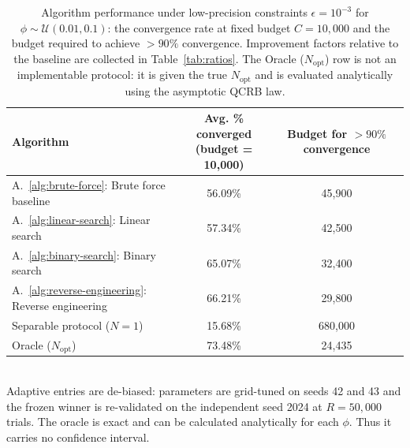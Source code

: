 \begin{table}[ht]
\centering
\caption{Algorithm performance under low-precision constraints $\epsilon=10^{-3}$ for $\phi\sim\mathcal{U}(0.01,0.1)$: the convergence rate at fixed budget $C=10{,}000$ and the budget required to achieve \(>90\%\) convergence. Improvement factors relative to the baseline are collected in Table~\ref{tab:ratios}. The Oracle ($N_\text{opt}$) row is not an implementable protocol: it is given the true $N_\text{opt}$ and is evaluated analytically using the asymptotic QCRB law.}
\label{tab:summary-low-prec}
\begin{tabular}{lcc}
\toprule
Algorithm
& \makecell{Avg. \% converged \\ (budget = 10{,}000)}
& \makecell{Budget for $>90\%$ \\ convergence} \\
\midrule
A.~\ref{alg:brute-force}: Brute force baseline
& 56.09\%
& 45{,}900 \\
A.~\ref{alg:linear-search}: Linear search
& 57.34\%
& 42{,}500 \\
A.~\ref{alg:binary-search}: Binary search
& 65.07\%
& 32{,}400 \\
A.~\ref{alg:reverse-engineering}: Reverse engineering
& 66.21\%
& 29{,}800 \\
\midrule
Separable protocol ($N=1$)
& 15.68\%
& 680{,}000 \\
\midrule
Oracle ($N_\text{opt}$)
& 73.48\%
& 24{,}435 \\
\bottomrule
\end{tabular}
\\[2pt]
\footnotesize Adaptive entries are de-biased: parameters are grid-tuned on seeds 42 and 43 and the frozen winner is re-validated on the independent seed 2024 at $R=50{,}000$ trials. The oracle is exact and can be calculated analytically for each $\phi$. Thus it carries no confidence interval.
\end{table}
